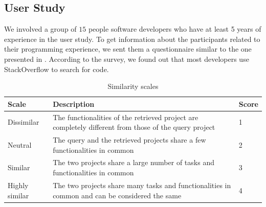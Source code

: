 
\newpage
\subsection{User Study}
We involved a group of $15$ people software developers who have at least 5 years of experience in the user study. To get information about the participants related to their programming experience, we sent them a questionnaire similar to the one presented in \cite{McMillan:2012:DSS:2337223.2337267}.%
According to the survey, we found out that most developers use StackOverflow to search for code.

\begin{table}[h!]
	\centering
	\begin{tabular}{|p{2.4cm}|p{8.0cm}|p{1.0cm}|}  \hline
		{\bf Scale} & {\bf Description} & {\bf Score} \\  \hline
		Dissimilar & The functionalities of the retrieved project are completely different from those of the query project & 1 \\ \hline
		Neutral & The query and the retrieved projects share a few functionalities in common & 2 \\ \hline
		Similar & The two projects share a large number of tasks and functionalities in common & 3 \\ \hline
		Highly similar & The two projects share many tasks and functionalities in common and can be considered the same & 4 \\ \hline
	\end{tabular}
	\caption[Similarity scales]{Similarity scales}
	\label{tab:Scales}
\end{table}


